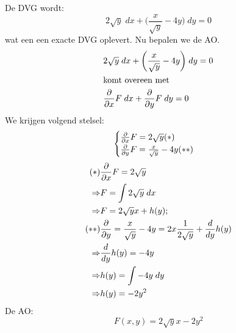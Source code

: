 {   De DVG wordt:
   $$2\sqrt{y}\; dx  + \bigg(\frac{x}{\sqrt{y}} - 4y\bigg)\; dy = 0$$
   wat een een exacte DVG oplevert. Nu bepalen we de AO.
   \begin{equation*}
    \begin{split}
     & 2\sqrt{y}\; dx  + \bigg(\frac{x}{\sqrt{y}} - 4y\bigg)\; dy = 0 \\
     &   \hbox{komt overeen met} \\
     & \frac{\partial}{\partial x}F\; dx + \frac{\partial}{\partial y}F\;dy = 0
    \end{split}
   \end{equation*}
    We krijgen volgend stelsel:
    $$\begin{cases}
       \frac{\partial}{\partial x}F = 2\sqrt{y} (*) \\
       \frac{\partial}{\partial y}F = \frac{x}{\sqrt{y}} - 4y (**)
      \end{cases}
    $$
    \begin{equation*}
     \begin{split}
      (*) & \frac{\partial}{\partial x}F = 2\sqrt{y}  \\
      \Rightarrow & F = \int 2\sqrt{y}\; dx  \\
      \Rightarrow & F = 2\sqrt{y}x + h(y); \\
      (**) & \frac{\partial}{\partial y} = \frac{x}{\sqrt{y}} - 4y = 2x\frac{1}{2\sqrt{y}} + \frac{d}{d y}h(y) \\
      \Rightarrow & \frac{d}{d y}h(y) = -4y \\
      \Rightarrow & h(y) = \int -4y \; dy \\
      \Rightarrow & h(y) = -2y^2
     \end{split}
    \end{equation*}
    De AO:
    $$F(x, y) = 2\sqrt{y}x - 2y^2$$
}
